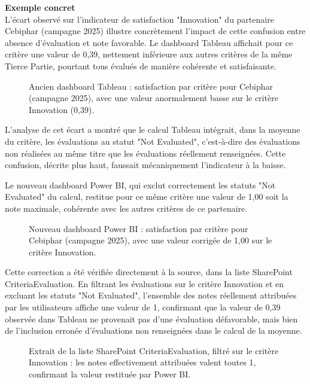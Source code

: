 \textbf{Exemple concret} \\
L'écart observé sur l'indicateur de satisfaction "Innovation" du partenaire Cebiphar 
(campagne 2025) illustre concrètement l'impact de cette confusion entre absence d'évaluation 
et note favorable. Le dashboard Tableau affichait pour ce critère une valeur de 0,39, nettement 
inférieure aux autres critères de la même Tierce Partie, pourtant tous évalués de manière 
cohérente et satisfaisante. 

\begin{figure}[H]
    \centering
    \caption{Ancien dashboard Tableau : satisfaction par critère pour Cebiphar (campagne 2025), avec une valeur anormalement basse sur le critère Innovation (0,39).}
    \label{valeur_anormalement_basse}
\end{figure}

L'analyse de cet écart a montré que le calcul Tableau intégrait, dans la moyenne du 
critère, les évaluations au statut "Not Evaluated", c'est-à-dire des évaluations non réalisées au 
même titre que les évaluations réellement renseignées. Cette confusion, décrite plus haut, 
faussait mécaniquement l'indicateur à la baisse.

Le nouveau dashboard Power BI, qui exclut correctement les statuts "Not Evaluated" du 
calcul, restitue pour ce même critère une valeur de 1,00 soit la note maximale, cohérente avec 
les autres critères de ce partenaire. 

\begin{figure}[H]
    \centering
    \caption{Nouveau dashboard Power BI : satisfaction par critère pour Cebiphar (campagne 2025), avec une valeur corrigée de 1,00 sur le critère Innovation.}
    \label{Nouveau_dashboard_Power_BI}
\end{figure}

Cette correction a été vérifiée directement à la source, dans la liste SharePoint 
CriteriaEvaluation. En filtrant les évaluations sur le critère Innovation et en excluant les statuts 
"Not Evaluated", l'ensemble des notes réellement attribuées par les utilisateurs affiche une 
valeur de 1, confirmant que la valeur de 0,39 observée dans Tableau ne provenait pas d'une 
évaluation défavorable, mais bien de l'inclusion erronée d'évaluations non renseignées dans 
le calcul de la moyenne.

\begin{figure}[H]
    \centering
    \caption{Extrait de la liste SharePoint CriteriaEvaluation, filtré sur le critère Innovation : les notes effectivement attribuées valent toutes 1, confirmant la valeur restituée par Power BI.}
    \label{Extrait_de_la_liste_SharePoint_CriteriaEvaluation}
\end{figure}

